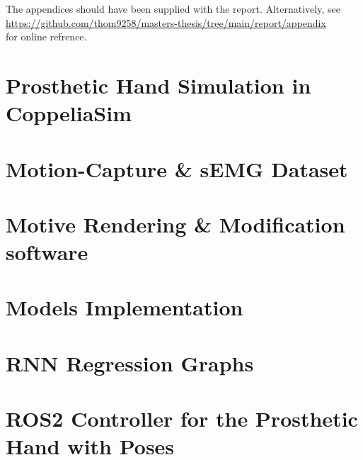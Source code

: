 \documentclass[a4paper, 12pt]{article}
\begin{document}
\printbibliography

\newpage
\listofappendices  %
\appendix %


The appendices should have been supplied with the report.
Alternatively, see \\
\url{https://github.com/thom9258/masters-thesis/tree/main/report/appendix} \\
for online refrence.

\section{Prosthetic Hand Simulation in CoppeliaSim}
\label{appendix:handsim}

\section{Motion-Capture \& sEMG Dataset}
\label{appendix:dataset}

\section{Motive Rendering \& Modification software}
\label{appendix:motivefixing}

\section{Models Implementation}
\label{appendix:models}

\section{RNN Regression Graphs}
\label{appendix:rnnregression}

\section{ROS2 Controller for the Prosthetic Hand with Poses}
\label{appendix:roscontroller}
\end{document}
